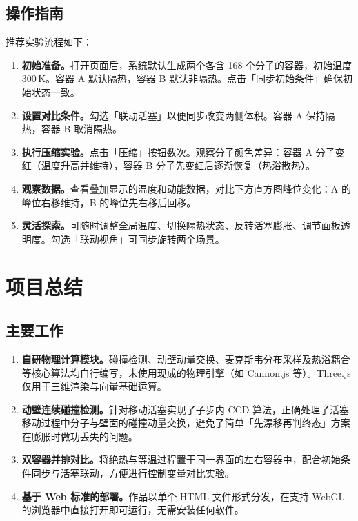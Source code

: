 \documentclass[zihao=-4,a4paper,oneside]{ctexbook}
\newcommand{\chapternb}[1]{%
  \bgroup
  \let\clearpage\relax
  \let\cleardoublepage\relax
  \chapter{#1}%
  \egroup
}
\begin{document}
\section{操作指南}

推荐实验流程如下：

\begin{enumerate}
  \item \textbf{初始准备。}打开页面后，系统默认生成两个各含 168 个分子的容器，初始温度 300\,K。容器 A 默认隔热，容器 B 默认非隔热。点击「同步初始条件」确保初始状态一致。
  \item \textbf{设置对比条件。}勾选「联动活塞」以便同步改变两侧体积。容器 A 保持隔热，容器 B 取消隔热。
  \item \textbf{执行压缩实验。}点击「压缩」按钮数次。观察分子颜色差异：容器 A 分子变红（温度升高并维持），容器 B 分子先变红后逐渐恢复（热浴散热）。
  \item \textbf{观察数据。}查看叠加显示的温度和动能数据，对比下方直方图峰位变化：A 的峰位右移维持，B 的峰位先右移后回移。
  \item \textbf{灵活探索。}可随时调整全局温度、切换隔热状态、反转活塞膨胀、调节面板透明度。勾选「联动视角」可同步旋转两个场景。
\end{enumerate}

\chapternb{项目总结}

\section{主要工作}

\begin{enumerate}
  \item \textbf{自研物理计算模块。}碰撞检测、动壁动量交换、麦克斯韦分布采样及热浴耦合等核心算法均自行编写，未使用现成的物理引擎（如 Cannon.js 等）。Three.js 仅用于三维渲染与向量基础运算。
  \item \textbf{动壁连续碰撞检测。}针对移动活塞实现了子步内 CCD 算法，正确处理了活塞移动过程中分子与壁面的碰撞动量交换，避免了简单「先漂移再判终态」方案在膨胀时做功丢失的问题。
  \item \textbf{双容器并排对比。}将绝热与等温过程置于同一界面的左右容器中，配合初始条件同步与活塞联动，方便进行控制变量对比实验。
  \item \textbf{基于 Web 标准的部署。}作品以单个 HTML 文件形式分发，在支持 WebGL 的浏览器中直接打开即可运行，无需安装任何软件。
\end{enumerate}
\end{document}
